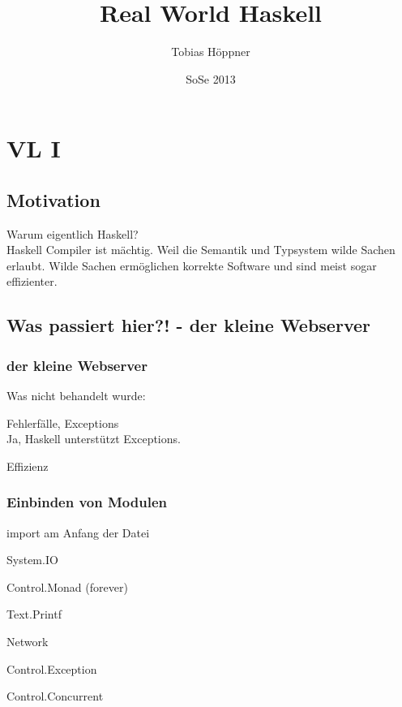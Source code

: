 \documentclass[ngerman,a4paper]{report}
\author{Tobias Höppner}
\title{Real World Haskell}
\date{SoSe 2013}
\begin{document}
\maketitle
\tableofcontents
\chapter{VL I}
\section{Motivation}
Warum eigentlich Haskell?\\
Haskell Compiler ist mächtig. Weil die Semantik und Typsystem wilde Sachen erlaubt. Wilde Sachen ermöglichen korrekte Software und sind meist sogar effizienter.\\

\section{Was passiert hier?! - der kleine Webserver}

\subsection{der kleine Webserver}



Was nicht behandelt wurde:
\begin{compactitem}
\item Fehlerfälle, Exceptions\\
Ja, Haskell unterstützt Exceptions.
\item Effizienz
\end{compactitem}


\subsection{Einbinden von Modulen}
import am Anfang der Datei
\begin{compactitem}
\item System.IO
\item Control.Monad (forever)
\item Text.Printf
\item Network
\item Control.Exception
\item Control.Concurrent
\end{compactitem}
\end{document}
